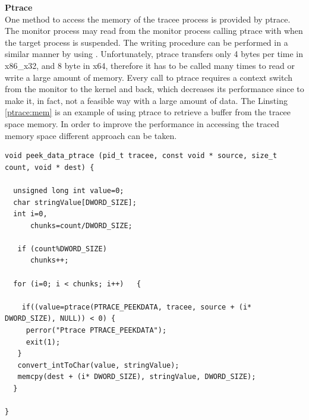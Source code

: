 \textbf{Ptrace}\\
One method to access the memory of the tracee process is provided by ptrace. The monitor process may read from the monitor process calling ptrace with  when the target process is suspended. The writing procedure can be performed in a similar manner by using . Unfortunately, ptrace transfers only 4 bytes per time in x86\_x32, and 8 byte in x64, therefore it has to be called many times to read or write a large amount of memory. Every call to ptrace requires a context switch from the monitor to the kernel and back, which decreases its performance since to make it, in fact, not a feasible way with a large amount of data. The Linsting \ref{ptrace:mem} is an example of using ptrace to retrieve a buffer from the tracee space memory. In order to improve the performance in accessing the traced memory space different approach can be taken. 
\begin{center}
\lstset{escapechar=@,style=c}
\begin{lstlisting}[label=ptrace:mem, caption={Function which retrieve a buffer of size count from the tracee memory. Note, the value retrivied by a single ptrace call has to be converted to the char type before being inserted in the buffer. }]
void peek_data_ptrace (pid_t tracee, const void * source, size_t count, void * dest) {
    
  unsigned long int value=0; 
  char stringValue[DWORD_SIZE]; 
  int i=0, 
      chunks=count/DWORD_SIZE; 
  
   if (count%DWORD_SIZE) 
      chunks++; 
      
  for (i=0; i < chunks; i++)   {
  
    if((value=ptrace(PTRACE_PEEKDATA, tracee, source + (i* DWORD_SIZE), NULL)) < 0) {
     perror("Ptrace PTRACE_PEEKDATA"); 
     exit(1); 
   }
   convert_intToChar(value, stringValue);
   memcpy(dest + (i* DWORD_SIZE), stringValue, DWORD_SIZE); 
  }
  
}
\end{lstlisting}
\end{center}


